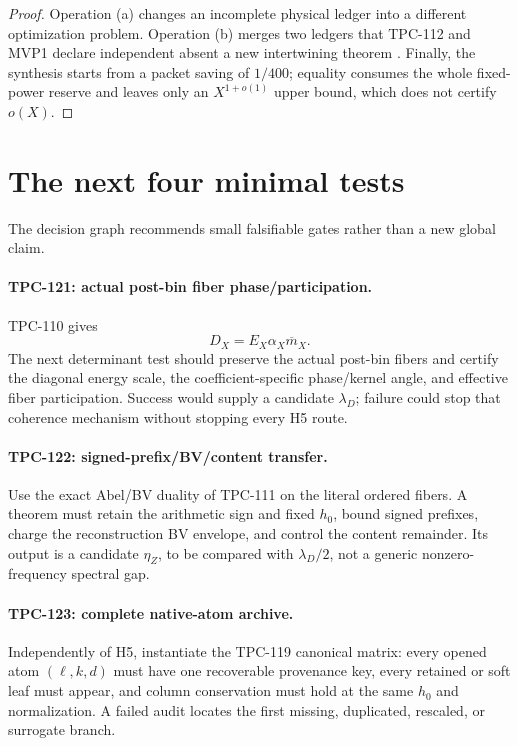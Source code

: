 \documentclass[11pt,a4paper]{article}
\theoremstyle{definition}
\theoremstyle{remark}
\begin{document}
\begin{proof}
Operation (a) changes an incomplete physical ledger into a different
optimization problem.  Operation (b) merges two ledgers that
TPC-112 and MVP1 declare independent absent a new intertwining
theorem \citep{WangTPC112,WangMVP1}.  Finally, the synthesis starts
from a packet saving of \(1/400\); equality consumes the whole
fixed-power reserve and leaves only an \(X^{1+o(1)}\) upper bound,
which does not certify \(o(X)\).
\end{proof}

\section{The next four minimal tests}

The decision graph recommends small falsifiable gates rather than a
new global claim.

\paragraph{TPC-121: actual post-bin fiber phase/participation.}
TPC-110 gives
\[
 D_X=E_X\alpha_X\overline m_X.
\]
The next determinant test should preserve the actual post-bin fibers
and certify the diagonal energy scale, the coefficient-specific
phase/kernel angle, and effective fiber participation.  Success
would supply a candidate \(\lambda_D\); failure could stop that
coherence mechanism without stopping every H5 route.

\paragraph{TPC-122: signed-prefix/BV/content transfer.}
Use the exact Abel/BV duality of TPC-111 on the literal ordered
fibers.  A theorem must retain the arithmetic sign and fixed \(h_0\),
bound signed prefixes, charge the reconstruction BV envelope, and
control the content remainder.  Its output is a candidate
\(\eta_Z\), to be compared with \(\lambda_D/2\), not a generic
nonzero-frequency spectral gap.

\paragraph{TPC-123: complete native-atom archive.}
Independently of H5, instantiate the TPC-119 canonical matrix:
every opened atom \((\ell,k,d)\) must have one recoverable provenance
key, every retained or soft leaf must appear, and column conservation
must hold at the same \(h_0\) and normalization.  A failed audit
locates the first missing, duplicated, rescaled, or surrogate branch.
\end{document}
